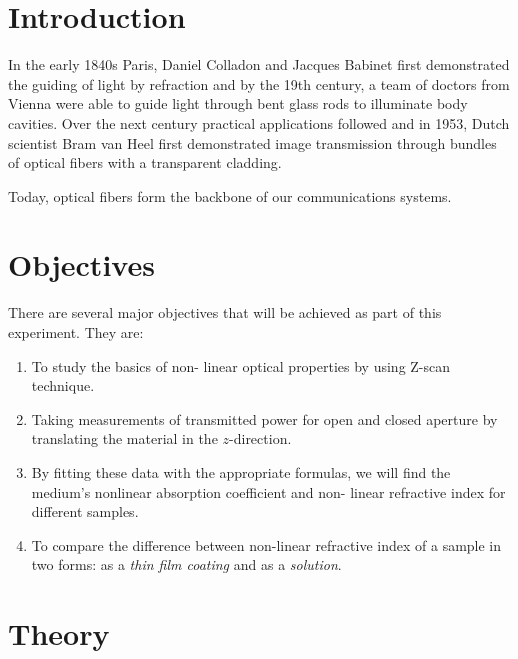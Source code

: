 \documentclass[%
 reprint,
 amsmath,amssymb,
 aps,
]{revtex4-2}
\begin{document}
\maketitle


\section{Introduction}


In the early 1840s Paris, Daniel Colladon and Jacques Babinet first demonstrated the guiding of light by refraction and by the 19th century, a team of doctors from Vienna were able to guide light through bent glass rods to illuminate body cavities. Over the next century practical applications followed and in 1953, Dutch scientist Bram van Heel first demonstrated image transmission through bundles of optical fibers with a transparent cladding. 

Today, optical fibers form the backbone of our communications systems.
\section{Objectives}
	There are several major objectives that will be achieved as part of this experiment. They are:
	\begin{enumerate}
		\item To study the basics of non-
		linear optical properties by
		using Z-scan technique.
		\item Taking measurements of transmitted power for open and
		closed aperture by translating
		the material in the $ z $-direction.
		\item By fitting these data with the
		appropriate formulas, we will
		find the medium's nonlinear
		absorption coefficient and non-
		linear refractive index for different samples.
		\item To compare the difference between non-linear refractive index of a sample in two forms: as a \textit{thin film coating} and as a \textit{solution}. 
	\end{enumerate}


	
	

\section{Theory}
	
\end{document}
